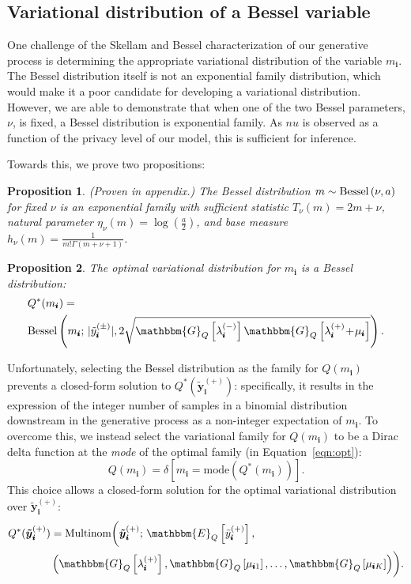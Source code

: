 \documentclass{article}
\newcommand{\subs}{\pmb{i}}
\newcommand{\wsup}[2]{#1_{\subs}^{(#2)}}
\newcommand{\ytP}{\wsup{\tilde{y}}{+}}
\newcommand{\ytPM}{\wsup{\tilde{y}}{\pm}}
\newcommand{\lamP}{\wsup{\lambda}{+}}
\newcommand{\lamM}{\wsup{\lambda}{-}}
\newcommand{\mus}{\mu_{\subs}}
\newcommand{\ms}{m_{\subs}}
\newcommand{\yvtP}{\boldsymbol{\tilde{y}}_{\subs}^{(+)}}
\newcommand{\Bess}[1]{\textup{Bessel}\left( #1 \right)}
\newcommand{\Eq}[1]{\mathbbm{E}_Q\left[#1\right]}
\newcommand{\Gq}[1]{\mathbbm{G}_Q\left[#1\right]}
\newcommand{\teq}{\!=\!}
\newcommand{\tp}{\!+\!}
\newtheorem{proposition}{Proposition}
\begin{document}
  \subsection{Variational distribution of a Bessel variable}
  
  One challenge of the Skellam and Bessel characterization of our generative process
  is determining the appropriate variational distribution of the variable $\ms$. The
  Bessel distribution itself is not an exponential family distribution, which would
  make it a poor candidate for developing a variational distribution. However, we are
  able to demonstrate that when one of the two Bessel parameters, $\nu$, is fixed,
  a Bessel distribution is exponential family. As $nu$ is observed as a function of the
  privacy level of our model, this is sufficient for inference.

  Towards this, we prove two propositions:
  
  \begin{proposition} (Proven in appendix.) The Bessel
  distribution $m \sim \Bess{\nu, a}$ for fixed $\nu$ is an exponential family
  with sufficient statistic $T_{\nu}(m) \teq 2m \tp \nu$, natural parameter
  $\eta_{\nu}(m)\teq \log(\frac{a}{2})$, and base measure $h_{\nu}(m) \teq
  \frac{1}{m!\Gamma(m\tp\nu\tp 1)}$. 
  \end{proposition}
  
  \begin{proposition} The optimal variational distribution for $\ms$ is a Bessel
  distribution:
  \begin{align}
  \label{eqn:opt}
  \begin{split}
  &Q^*(\ms) =\\
  &\Bess{\ms; \, |\ytPM|, 2\sqrt{\Gq{\lamM}\Gq{\lamP \tp \mus}}}.
  \end{split}
  \end{align}
  \end{proposition}

  Unfortunately, selecting the Bessel distribution as the family for $Q(\ms)$
  prevents a closed-form solution to $Q^*(\yvtP)$: specifically, it results in
  the expression of the integer number of samples in a binomial distribution
  downstream in the generative process as a non-integer expectation of $\ms$. To
  overcome this, we instead select the variational family for $Q(\ms)$ to be a
  Dirac delta function at the \emph{mode} of the optimal family (in
  Equation~\ref{eqn:opt}):
  \begin{equation}
  Q(\ms) = \delta\left[\ms \teq \textrm{mode}(Q^*(\ms))\right].
  \end{equation}
  This choice allows a closed-form solution for the optimal variational
  distribution over $\yvtP$:
  \begin{align}
  \label{eqn:opt-multi}
  \begin{split}
  Q^*(\yvtP) &= \textup{Multinom} \biggl(\yvtP;\, \Eq{\ytP},\\
  &\left(\Gq{\lamP}, \Gq{\mu_{\subs 1}}, \dots, \Gq{\mu_{\subs K}} \right) \biggr).
  \end{split}
  \end{align}
\end{document}
